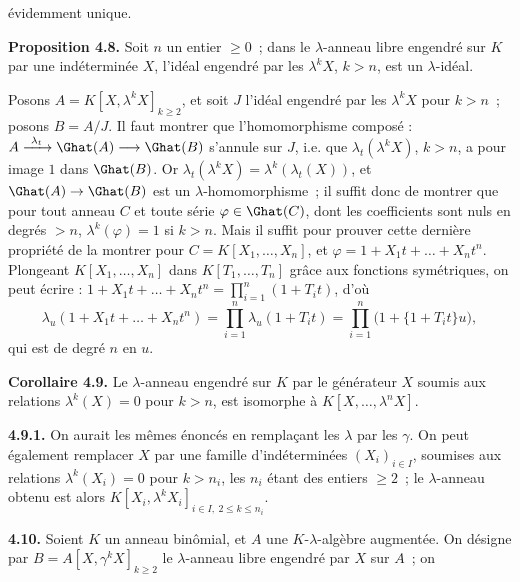 évidemment unique.

\textbf{Proposition 4.8.} Soit \(n\) un entier \(\ge0\)~; dans le \(\lambda\)-anneau libre engendré sur \(K\) par une indéterminée \(X\), l'idéal engendré par les \(\lambda^k X\), \(k>n\), est un \(\lambda\)-idéal.

Posons \(A=K[X,\lambda^k X]_{k\ge2}\), et soit \(J\) l'idéal engendré par les \(\lambda^k X\) pour \(k>n\)~; posons \(B=A/J\). Il faut montrer que l'homomorphisme composé : \(A\xrightarrow{\ \lambda_t\ }\Ghat(A)\longrightarrow\Ghat(B)\) s'annule sur \(J\), i.e. que \(\lambda_t(\lambda^k X)\), \(k>n\), a pour image \(1\) dans \(\Ghat(B)\). Or \(\lambda_t(\lambda^k X)=\lambda^k(\lambda_t(X))\), et \(\Ghat(A)\to\Ghat(B)\) est un \(\lambda\)-homomorphisme~; il suffit donc de montrer que pour tout anneau \(C\) et toute série \(\varphi\in\Ghat(C)\), dont les coefficients sont nuls en degrés \(>n\), \(\lambda^k(\varphi)=1\) si \(k>n\). Mais il suffit pour prouver cette dernière propriété de la montrer pour \(C=K[X_1,\ldots,X_n]\), et \(\varphi=1+X_1t+\ldots+X_nt^n\). Plongeant \(K[X_1,\ldots,X_n]\) dans \(K[T_1,\ldots,T_n]\) grâce aux fonctions symétriques, on peut écrire : \(1+X_1t+\ldots+X_nt^n=\prod_{i=1}^{n}(1+T_it)\), d'où
\[
  \lambda_u(1+X_1t+\ldots+X_nt^n)=\prod_{i=1}^{n}\lambda_u(1+T_it)=\prod_{i=1}^{n}\bigl(1+\{1+T_it\}u\bigr),
\]
qui est de degré \(n\) en \(u\).

\textbf{Corollaire 4.9.} Le \(\lambda\)-anneau engendré sur \(K\) par le générateur \(X\) soumis aux relations \(\lambda^k(X)=0\) pour \(k>n\), est isomorphe à \(K[X,\ldots,\lambda^n X]\).

\textbf{4.9.1.} On aurait les mêmes énoncés en remplaçant les \(\lambda\) par les \(\gamma\). On peut également remplacer \(X\) par une famille d'indéterminées \((X_i)_{i\in I}\), soumises aux relations \(\lambda^k(X_i)=0\) pour \(k>n_i\), les \(n_i\) étant des entiers \(\ge2\)~; le \(\lambda\)-anneau obtenu est alors \(K[X_i,\lambda^k X_i]_{i\in I,\ 2\le k\le n_i}\).

\textbf{4.10.} Soient \(K\) un anneau binômial, et \(A\) une \(K\)-\(\lambda\)-algèbre augmentée. On désigne par \(B=A[X,\gamma^k X]_{k\ge2}\) le \(\lambda\)-anneau libre engendré par \(X\) sur \(A\)~; on
